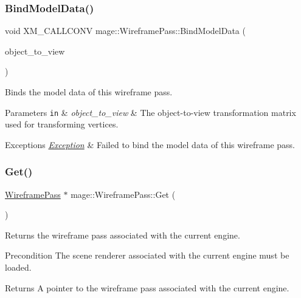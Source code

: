 \subsubsection{\texorpdfstring{Bind\+Model\+Data()}{BindModelData()}}
{\footnotesize\ttfamily void X\+M\+\_\+\+C\+A\+L\+L\+C\+O\+NV mage\+::\+Wireframe\+Pass\+::\+Bind\+Model\+Data (\begin{DoxyParamCaption}\item[{F\+X\+M\+M\+A\+T\+R\+IX}]{object\+\_\+to\+\_\+view }\end{DoxyParamCaption})\hspace{0.3cm}{\ttfamily [private]}}

Binds the model data of this wireframe pass.


\begin{DoxyParams}[1]{Parameters}
\mbox{\tt in}  & {\em object\+\_\+to\+\_\+view} & The object-\/to-\/view transformation matrix used for transforming vertices. \\
\hline
\end{DoxyParams}

\begin{DoxyExceptions}{Exceptions}
{\em \hyperlink{classmage_1_1_exception}{Exception}} & Failed to bind the model data of this wireframe pass. \\
\hline
\end{DoxyExceptions}
\hypertarget{classmage_1_1_wireframe_pass_ace5168eac9d32c1bfa71df3411960f48}{}\label{classmage_1_1_wireframe_pass_ace5168eac9d32c1bfa71df3411960f48} 
\subsubsection{\texorpdfstring{Get()}{Get()}}
{\footnotesize\ttfamily \hyperlink{classmage_1_1_wireframe_pass}{Wireframe\+Pass} $\ast$ mage\+::\+Wireframe\+Pass\+::\+Get (\begin{DoxyParamCaption}{ }\end{DoxyParamCaption})\hspace{0.3cm}{\ttfamily [static]}}

Returns the wireframe pass associated with the current engine.

\begin{DoxyPrecond}{Precondition}
The scene renderer associated with the current engine must be loaded. 
\end{DoxyPrecond}
\begin{DoxyReturn}{Returns}
A pointer to the wireframe pass associated with the current engine. 
\end{DoxyReturn}
\hypertarget{classmage_1_1_wireframe_pass_a57da0b468c68c8653ebc639923b111ba}{}\label{classmage_1_1_wireframe_pass_a57da0b468c68c8653ebc639923b111ba} 

